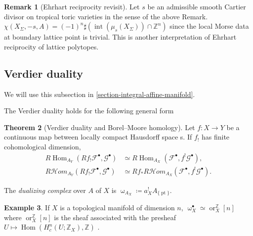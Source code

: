\documentclass[a4paper,dvipdfmx,reqno,12pt]{amsart}
\theoremstyle{definition}
\newtheorem{theorem}{Theorem}[section]
\newtheorem{example}[theorem]{Example}
\newtheorem{remark}[theorem]{Remark}
\newcommand{\deq}{\coloneqq}
\newcommand{\Z}{\mathbb{Z}}%
\newcommand{\mcal}[1]{\mathcal{#1}}%
\newcommand{\opn}[1]{\operatorname{#1}}
\numberwithin{equation}{section}
\begin{document}
\begin{remark}[{Ehrhart reciprocity revisit}]
Let $s$ be an admissible smooth Cartier divisor on 
tropical toric varieties in the sense of the above Remark.
$\chi(X_{\Sigma},-s,A)=(-1)^{n}\sharp (\opn{int}(\mu_s(X_{\Sigma}))\cap \Z^{n})$ since
the local Morse data at boundary lattice point is trivial.
This is another interpretation of Ehrhart reciprocity of 
lattice polytopes.
\end{remark}



\iffalse
From definition,
\begin{align}
df(x)\notin \opn{Lin}(S,x)^{\bot} 
\Rightleftarrows df|_{\opn{Lin}(S,x)}(x)\ne 0
\end{align}

Fix a polyhedral fan structure $\mathscr{P}$ of 
$S/\opn{Lin}(S,x)$. The pullback induced from
$\opn{pr}\colon S\to S/\opn{Lin}(S,x)$ induces 
a fan structure on
$\bigcup_{x\in sigma \in \mathscr{P}}\sigma=
\opn{Lin}(S,x)$.

\fi
\subsection{Verdier duality}
We will use this subsection 
in \cref{section-integral-affine-manifold}.

The Verdier duality holds for the following general form
\cite[Proposition 3.1.10]{MR1299726}


\begin{theorem}[{Verdier duality and 
Borel--Moore homology}]
Let $f\colon X\to Y$ be a continuous map between locally 
compact Hausdorff space s. If $f_!$ has finite cohomological
dimension, 
\begin{align}
R\opn{Hom}_{A_Y}(R f_!\mcal{F}^{\bullet},\mcal{G}^{\bullet})    & \simeq R\opn{Hom}_{A_X}(\mcal{F}^{\bullet},f^{!}\mcal{G}^{\bullet}),        \\
R \mcal{H}om_{A_Y}(R f_! \mcal{F}^{\bullet},\mcal{G}^{\bullet}) & \simeq Rf_* R\mcal{H}om_{A_X}(\mcal{F}^{\bullet},f^{!}\mcal{G}^{\bullet}).
\end{align}
\end{theorem}



The \emph{dualizing complex} over $A$ of $X$ is 
$\upomega_{A_X}\deq a^{!}_{X}A_{\{\opn{pt}\}}$.

\begin{example}
If $X$ is a topological manifold of dimension $n$, 
$\upomega^{\bullet}_{X}\simeq \opn{or}_{X}^{\Z}[n]$ 
where $\opn{or}_{X}^{\mathbb{Z}}[n]$ is the sheaf 
associated with the presheaf $U\mapsto 
\opn{Hom}(H^{n}_c(U;\mathbb{Z}_{X}),\mathbb{Z})$
\cite[Proposition 3.3.6]{MR1299726}.
\end{example}
\end{document}
